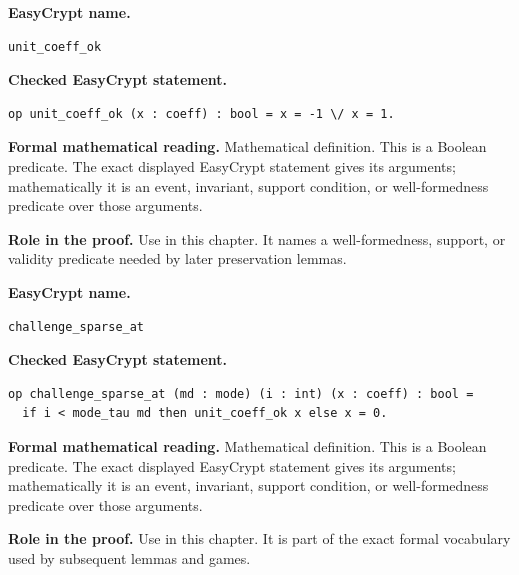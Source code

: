 \begin{formaldefinition}
\noindent\textbf{EasyCrypt name.}
\begin{lstlisting}[language=EasyCrypt,basicstyle=\ttfamily\scriptsize]
unit_coeff_ok
\end{lstlisting}
\noindent\textbf{Checked EasyCrypt statement.}
\begin{lstlisting}[language=EasyCrypt,basicstyle=\ttfamily\scriptsize]
op unit_coeff_ok (x : coeff) : bool = x = -1 \/ x = 1.
\end{lstlisting}
\noindent\textbf{Formal mathematical reading.}
Mathematical definition. This is a Boolean predicate.  The exact displayed EasyCrypt statement gives its arguments; mathematically it is an event, invariant, support condition, or well-formedness predicate over those arguments.

\noindent\textbf{Role in the proof.}
Use in this chapter. It names a well-formedness, support, or validity predicate needed by later preservation lemmas.

\end{formaldefinition}

\begin{formaldefinition}
\noindent\textbf{EasyCrypt name.}
\begin{lstlisting}[language=EasyCrypt,basicstyle=\ttfamily\scriptsize]
challenge_sparse_at
\end{lstlisting}
\noindent\textbf{Checked EasyCrypt statement.}
\begin{lstlisting}[language=EasyCrypt,basicstyle=\ttfamily\scriptsize]
op challenge_sparse_at (md : mode) (i : int) (x : coeff) : bool =
  if i < mode_tau md then unit_coeff_ok x else x = 0.
\end{lstlisting}
\noindent\textbf{Formal mathematical reading.}
Mathematical definition. This is a Boolean predicate.  The exact displayed EasyCrypt statement gives its arguments; mathematically it is an event, invariant, support condition, or well-formedness predicate over those arguments.

\noindent\textbf{Role in the proof.}
Use in this chapter. It is part of the exact formal vocabulary used by subsequent lemmas and games.

\end{formaldefinition}

